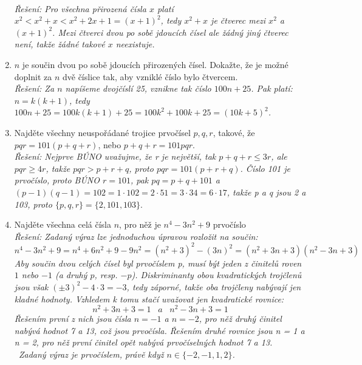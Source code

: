 \documentclass[12pt,a4paper]{report}
\begin{document}
\begin{enumerate}
	\\ \textit{Řešení: Pro všechna přirozená čísla $x$ platí $x^2 < x^2+x < x^2+2x+1 = (x+1)^2$, tedy $x^2+x$ je čtverec mezi $x^2$ a $(x+1)^2$. Mezi čtverci dvou po sobě jdoucích čísel ale žádný jiný čtverec není, takže žádné takové $x$ neexistuje. }
	\item $n$ je součin dvou po sobě jdoucích přirozených čísel. Dokažte, že je možné doplnit za $n$ dvě číslice tak, aby vzniklé číslo bylo čtvercem.
	\\ \textit{Řešení: Za $n$ napíšeme dvojčíslí 25, vznikne tak číslo $100n+25$. Pak platí: $n=k(k+1)$, tedy $100n+25=100k(k+1)+25=100k^2+100k+25=(10k+5)^2$.}
	\item Najděte všechny neuspořádané trojice prvočísel $p, q, r$, takové, že $pqr = 101(p + q + r)$, nebo $p + q + r = 101pqr$.
	\\ \textit{Řešení: Nejprve BÚNO uvažujme, že r je největší, tak $p+q+r \leq 3r$, ale $pqr \geq 4r$,
		takže $pqr > p + r + q$, proto $pqr = 101(p + r + q)$.
		Číslo 101 je prvočíslo, proto BÚNO $r = 101$, pak $pq = p+q+101$ a $(p-1)(q-1) = 102 = 1 \cdot 102 = 2 \cdot 51 = 3 \cdot 34 = 6 \cdot 17$, takže p a q jsou 2 a 103, proto $\{p, q, r\} = \{2, 101, 103\}.$}
	\item Najděte všechna celá čísla $n$, pro něž je $n^4 - 3n^2 + 9$ prvočíslo
	\\ \textit{Řešení: Zadaný výraz lze jednoduchou úpravou rozložit na součin: $$n^4 - 3n^2 + 9=n^4 + 6n^2 + 9 - 9n^2 = (n^2 + 3)^2 - (3n)^2= (n^2 + 3n +3)(n^2 - 3n +3)$$ Aby součin dvou celých čísel byl prvočíslem p, musí být jeden z činitelů roven $1$ nebo $-1$ (a druhý $p$, resp. $-p$). Diskriminanty obou kvadratických trojčlenů jsou však $(\pm3)^2 - 4 \cdot 3 = -3$, tedy záporné, takže oba trojčleny nabývají jen kladné hodnoty. Vzhledem k tomu stačí uvažovat jen kvadratické rovnice: $$n^2 + 3n +3=1 \hspace{10pt}a\hspace{10pt} n^2 - 3n +3=1$$ Řešením první z nich jsou čísla $n = -1$ a $n = -2$, pro něž druhý činitel nabývá
		hodnot 7 a 13, což jsou prvočísla. Řešením druhé rovnice jsou n = 1 a n = 2, pro něž první činitel opět nabývá prvočíselných hodnot 7 a 13.\\\ Zadaný výraz je prvočíslem, právě když $n \in \{-2, -1, 1, 2\}$.}
	

\end{enumerate}
\end{document}
